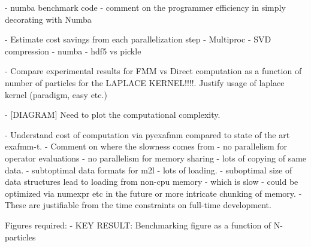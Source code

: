 - numba benchmark code
    - comment on the programmer efficiency in simply decorating with Numba

- Estimate cost savings from each parallelization step
- Multiproc
- SVD compression
- numba
- hdf5 vs pickle

- Compare experimental results for FMM vs Direct computation as a function of number of particles for the LAPLACE KERNEL!!!!. Justify usage of laplace kernel (paradigm, easy etc.)

- [DIAGRAM] Need to plot the computational complexity.

- Understand cost of computation via pyexafmm compared to state of the art exafmm-t.
    - Comment on where the slowness comes from
        - no parallelism for operator evaluations
        - no parallelism for memory sharing
            - lots of copying of same data.
        - subtoptimal data formats for m2l - lots of loading.
        - suboptimal size of data structures lead to loading from non-cpu memory - which is slow - could be optimized via numexpr etc in the future or more intricate chunking of memory.
    - These are justifiable from the time constraints on full-time development.

Figures required:
    - KEY RESULT: Benchmarking figure as a function of N-particles
